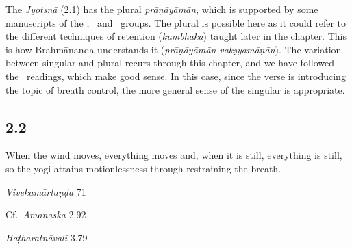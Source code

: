 \begin{ekdosis}
\begin{philcomm}[hp02_001]
The \emph{Jyotsnā} (2.1) has the plural \emph{prāṇāyāmān}, which is supported by some manuscripts of the \textbeta, \textgamma\ and \textepsilon\ groups. The plural is possible here as it could refer to the different techniques of retention (\emph{kumbhaka}) taught later in the chapter. This is how Brahmānanda understands it (\emph{prāṇāyāmān vakṣyamāṇān}). The variation between singular and plural recurs through this chapter, and we have followed the \textalpha\ readings, which make good sense. In this case, since the verse is introducing the topic of breath control, the more general sense of the singular is appropriate.
\end{philcomm}

\subsection*{2.2}
\begin{translation}[hp02_002]
When the wind moves, everything moves and, when it is still, everything is still, so the yogi attains motionlessness through restraining the breath.
\end{translation}

\begin{sources}[hp02_002]
\emph{Vivekamārtaṇḍa} 71

\begin{versinnote}
\tl{\var{71d vāyunibandhanāt ] VT; vāyuṃ nibaṃdhayet A, vāyuṃ nirundhayet G}\\!}
\end{versinnote}

Cf.~\emph{Amanaska} 2.92

\begin{versinnote}
\end{versinnote}
\end{sources}

\begin{testimonia}[hp02_002]
\emph{Haṭharatnāvalī} 3.79 


\end{testimonia}
\end{ekdosis}
